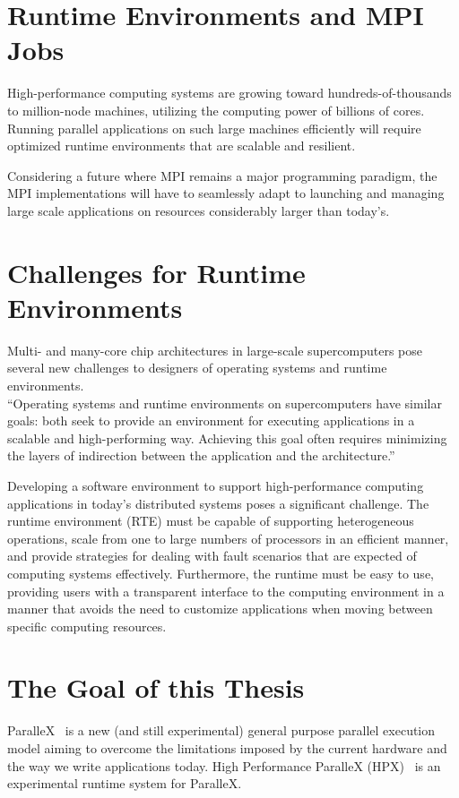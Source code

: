 \section{Runtime Environments and MPI Jobs}
High-performance computing systems are growing toward hundreds-of-thousands to million-node machines, utilizing the computing power of billions of cores. Running parallel applications on such large machines efficiently will require optimized runtime environments that are scalable and resilient.

Considering a future where MPI remains a major programming paradigm, the MPI implementations will have to seamlessly adapt to launching and managing large scale applications on resources considerably larger than today's.~\cite{bosilca2011scalability}

\section{Challenges for Runtime Environments}
Multi- and many-core chip architectures in large-scale supercomputers pose several new challenges to designers of operating systems and runtime environments.\\
``Operating systems and runtime environments on supercomputers have similar goals: both seek to provide an environment for executing applications in a scalable and high-performing way. Achieving this goal often requires minimizing the layers of indirection between the application and the architecture.''~\cite{Hoefler:2012:OSR:2237840.2237848}

Developing a software environment to support high-performance computing applications in today's distributed systems poses a significant challenge. The runtime environment (RTE) must be capable of supporting heterogeneous operations, scale from one to large numbers of processors in an efficient manner, and provide strategies for dealing with fault scenarios that are expected of computing systems effectively. Furthermore, the runtime must be easy to use, providing users with a transparent interface to the computing environment in a manner that avoids the need to customize applications when moving between specific computing resources.~\cite{Castain2008153}

\section{The Goal of this Thesis}
ParalleX~\cite{4228212} is a new (and still experimental) general purpose parallel execution model aiming to overcome the limitations imposed by the current hardware and the way we write applications today. High Performance ParalleX (HPX)~\cite{Kaiser:2014:HTB:2676870.2676883} is an experimental runtime system for ParalleX.

